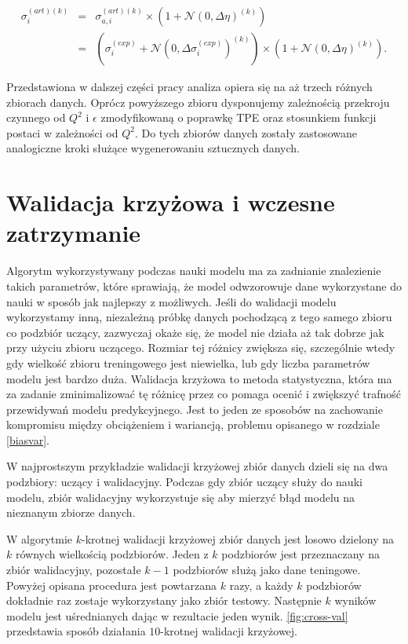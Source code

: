 \documentclass[11pt]{book}
\theoremstyle{definition}
\begin{document}
\begin{eqnarray}
\sigma^{(art)(k)}_{i}  &=& \sigma^{(art)(k)}_{a,i} \times \left( 1  + \mathcal{N}\left( 0, \Delta \eta \right)^{(k)} \right) \nonumber\\
&=& \left(\sigma_i^{(exp)} + \mathcal{N}\left( 0, \Delta \sigma_i^{(exp)} \right)^{(k)}\right) \times \left( 1  + \mathcal{N}\left( 0, \Delta \eta \right)^{(k)} \right).
\end{eqnarray}

Przedstawiona w dalszej części pracy analiza opiera się na aż trzech różnych zbiorach danych. Oprócz powyższego zbioru dysponujemy zależnością przekroju czynnego od $Q^2$ i $\epsilon$ zmodyfikowaną o poprawkę TPE oraz stosunkiem funkcji postaci w zależności od $Q^2$. Do tych zbiorów danych zostały zastosowane analogiczne kroki służące wygenerowaniu sztucznych danych.


\section{Walidacja krzyżowa i wczesne zatrzymanie}
\label{wcz_zat}

Algorytm wykorzystywany podczas nauki modelu ma za zadnianie znalezienie takich parametrów, które sprawiają, że model odwzorowuje dane wykorzystane do nauki w sposób jak najlepszy z możliwych. Jeśli do walidacji modelu wykorzystamy inną, niezależną próbkę danych pochodzącą z tego samego zbioru co podzbiór uczący, zazwyczaj okaże się, że model nie działa aż tak dobrze jak przy użyciu zbioru uczącego. Rozmiar tej różnicy zwiększa się, szczególnie wtedy gdy wielkość zbioru treningowego jest niewielka, lub gdy liczba parametrów modelu jest bardzo duża. Walidacja krzyżowa to metoda statystyczna, która ma za zadanie zminimalizować tę różnicę przez co pomaga ocenić i zwiększyć trafność przewidywań modelu predykcyjnego. Jest to jeden ze sposobów na zachowanie kompromisu między obciążeniem i wariancją, problemu opisanego w rozdziale \ref{biasvar}.

W najprostszym przykładzie walidacji krzyżowej zbiór danych dzieli się na dwa podzbiory: uczący i walidacyjny. Podczas gdy zbiór uczący służy do nauki modelu, zbiór walidacyjny wykorzystuje się aby mierzyć błąd modelu na nieznanym zbiorze danych. 

W algorytmie $k$-krotnej walidacji krzyżowej zbiór danych jest losowo dzielony na $k$ równych wielkością podzbiorów. Jeden z $k$ podzbiorów jest przeznaczany na zbiór walidacyjny, pozostałe $k-1$ podzbiorów służą jako dane teningowe. Powyżej opisana procedura jest powtarzana $k$ razy, a każdy $k$ podzbiorów dokładnie raz zostaje wykorzystany jako zbiór testowy. Następnie $k$ wyników modelu jest uśrednianych dając w rezultacie jeden wynik. \figurename{} \ref{fig:cross-val} przedstawia sposób działania $10$-krotnej walidacji krzyżowej.
\end{document}
